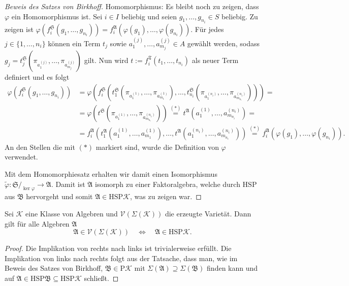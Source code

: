 \begin{proof}[Beweis des Satzes von Birkhoff]
    Homomorphismus: Es bleibt noch zu zeigen, dass $\varphi$ ein Homomorphismus ist.
    Sei $i\in I$ beliebig und seien $g_1,\ldots,g_{n_i}\in S$ beliebig. Zu zeigen ist $\varphi(f^\mathfrak{S}_i(g_1,\ldots,g_{n_i}))=f^\mathfrak{A}_i(\varphi(g_1),\ldots,\varphi(g_{n_i}))$.
    Für jedes $j\in \{1,\ldots,n_i\}$ können ein Term $t_j$ sowie $a_1^{(j)},\ldots,a_{m_j}^{(j)}\in A$ gewählt werden,
    sodass $g_j=t^\mathfrak{S}_j(\pi_{a_1^{(j)}},\ldots,\pi_{a_{m_j}^{(j)}})$ gilt. Nun wird $t:=f^\mathfrak{T}_i(t_1,\ldots,t_{n_i})$ als neuer Term definiert und es folgt
    \begin{align*}
        \varphi(f^\mathfrak{S}_i(g_1,\ldots,g_{n_i}))&=\varphi(f^\mathfrak{S}_i(t^\mathfrak{S}_1(\pi_{a_1^{(1)}},\ldots,\pi_{a_{m_1}^{(1)}}),\ldots,t^\mathfrak{S}_{n_i}(\pi_{a_1^{(n_i)}},\ldots,\pi_{a_{m_{n_i}}^{(n_i)}})))=\\
        &=\varphi(t^\mathfrak{S}(\pi_{a_1^{(1)}},\ldots,\pi_{a_{m_{n_i}}^{(n_i)}}))\stackrel{(*)}{=}t^\mathfrak{A}(a_1^{(1)},\ldots,a_{m_{n_i}}^{(n_i)})=\\
        &=f^\mathfrak{A}_i(t^\mathfrak{A}_1(a_1^{(1)},\ldots,a_{m_1}^{(1)}),\ldots,t^\mathfrak{A}(a_1^{(n_i)},\ldots,a_{m_{n_i}}^{(n_i)}))\stackrel{(*)}{=}f^\mathfrak{A}_i(\varphi(g_1),\ldots,\varphi(g_{n_i})).
    \end{align*}
    An den Stellen die mit $(*)$ markiert sind, wurde die Definition von $\varphi$ verwendet.

    Mit dem Homomorphiesatz erhalten wir damit einen Isomorphismus $\tilde{\varphi} : \mathfrak{S} /_{\ker \varphi} \to \mathfrak{A}$. Damit ist $\mathfrak{A}$ isomorph zu einer Faktoralgebra, welche durch $\mathrm{HSP}$ aus $\mathfrak{B}$ hervorgeht und somit $\mathfrak A\in \mathrm{HSP}\mathcal{K}$, was zu zeigen war.
\end{proof}

\begin{corollary}
    Sei $\mathcal{K}$ eine Klasse von Algebren und $\mathcal{V}(\Sigma(\mathcal{K}))$ die erzeugte Varietät. Dann gilt für alle Algebren $\mathfrak{A}$
    $$ \mathfrak{A} \in \mathcal{V}(\Sigma(\mathcal{K})) \quad \Leftrightarrow \quad \mathfrak{A} \in \mathrm{HSP}\mathcal{K}. $$
\end{corollary}

\begin{proof}
    Die Implikation von rechts nach links ist trivialerweise erfüllt. Die Implikation von links nach rechts folgt aus der Tatsache, dass man, wie im Beweis des Satzes von Birkhoff, $\mathfrak{B}\in \mathrm{P}\mathcal{K}$ mit $\Sigma(\mathfrak{A})\supseteq\Sigma(\mathfrak{B})$ finden kann und auf $\mathfrak{A}\in \mathrm{HSP}\mathfrak{B}\subseteq \mathrm{HSP}\mathcal{K}$ schließt.
\end{proof}